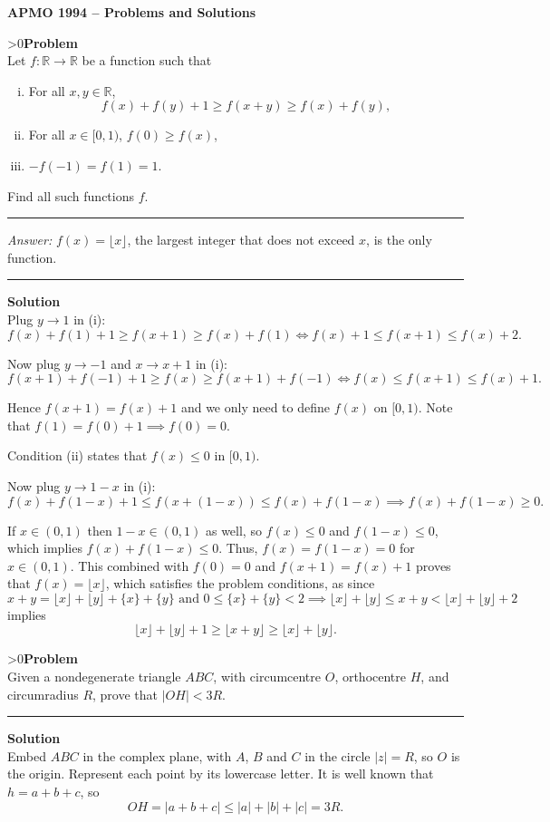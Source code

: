 \documentclass[12pt,oneside,a4paper]{book}
\newcounter{probnum}
\newcounter{solnum}
\newcommand{\prob}{\ifnum\value{probnum}>0\newpage\fi\setcounter{solnum}{0}\stepcounter{probnum}\textbf{Problem \theprobnum}\\}
\newcommand{\ans}{\medskip\hrule\medbreak\emph{Answer: }}
\newcommand{\sol}{\medskip\hrule\medbreak\textbf{Solution}\\}
\newcommand{\soln}{\stepcounter{solnum}\medskip\hrule\medbreak\textbf{Solution \thesolnum}\\}
\begin{document}
\begin{center}
\textbf{\large APMO 1994 -- Problems and Solutions}
\end{center}

\prob Let $f\colon \mathbb{R}\to \mathbb{R}$ be a function such that
\begin{enumerate}[(i)]
\item For all $x,y\in\mathbb{R}$,
\[f(x)+f(y)+1\ge f(x+y)\ge f(x)+f(y),\]
\item For all $x\in [0,1)$, $f(0)\ge f(x)$,
\item $-f(-1)=f(1)=1$.
\end{enumerate}

Find all such functions $f$.

\ans $f(x) = \lfloor x\rfloor$, the largest integer that does not exceed $x$, is the only function.

\sol
Plug $y\to1$ in (i):
\[f(x) + f(1) + 1 \ge f(x+1) \ge f(x)+f(1)\iff f(x)+1 \le f(x+1) \le f(x)+2.\]

Now plug $y\to -1$ and $x\to x+1$ in (i):
\[f(x+1) + f(-1) + 1\ge f(x) \ge f(x+1)+f(-1)\iff f(x)\le f(x+1) \le f(x)+1.\]

Hence $f(x+1) = f(x)+1$ and we only need to define $f(x)$ on $[0,1)$. Note that $f(1) = f(0)+1\implies f(0)=0$.

Condition (ii) states that $f(x) \le 0$ in $[0,1)$.

Now plug $y\to 1-x$ in (i):
\[f(x) + f(1-x) + 1 \le f(x+(1-x)) \le f(x) + f(1-x)\implies f(x)+f(1-x) \ge 0.\]

If $x\in (0,1)$ then $1-x\in (0,1)$ as well, so $f(x)\le 0$ and $f(1-x)\le 0$, which implies $f(x) + f(1-x) \le 0$. Thus, $f(x) = f(1-x) = 0$ for $x\in (0,1)$. This combined with $f(0)=0$ and $f(x+1) = f(x)+1$ proves that $f(x) = \lfloor x\rfloor$, which satisfies the problem conditions, as since
\[x+y = \lfloor x \rfloor + \lfloor y\rfloor + \{x\} + \{y\}\text{ and }0\le \{x\} + \{y\} < 2 \implies \lfloor x \rfloor + \lfloor y\rfloor \le x+y< \lfloor x \rfloor + \lfloor y\rfloor + 2\] 
implies
\[\lfloor x\rfloor + \lfloor y\rfloor +1 \ge \lfloor x+y\rfloor \ge \lfloor x\rfloor + \lfloor y\rfloor.\]

\prob Given a nondegenerate triangle $ABC$, with circumcentre $O$, orthocentre $H$, and circumradius $R$, prove that $|OH|<3R$.

\soln
Embed $ABC$ in the complex plane, with $A$, $B$ and $C$ in the circle $|z|=R$, so $O$ is the origin. Represent each point by its lowercase letter. It is well known that $h = a+b+c$, so
\[OH = |a+b+c| \le |a| + |b| + |c| = 3R.\]
\end{document}
